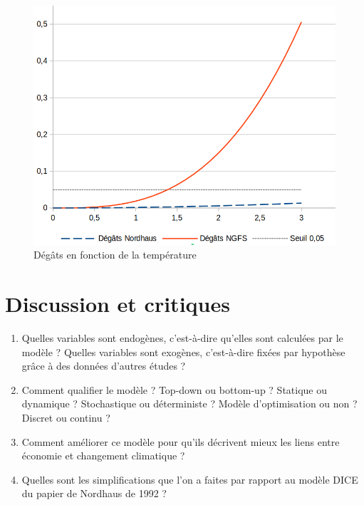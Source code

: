\documentclass[12pt]{article}
\theoremstyle{remark}
\begin{document}
\begin{figure}[h]
\centering
\includegraphics[scale=0.35]{images/fonction_degats.png}
\caption{Dégâts en fonction de la température}
\end{figure}

\section{Discussion et critiques}
\begin{enumerate}[resume]
\item Quelles variables sont endogènes, c'est-à-dire qu'elles sont calculées par le modèle ? Quelles variables sont exogènes, c'est-à-dire fixées par hypothèse grâce à des données d'autres études ?
\item Comment qualifier le modèle ? Top-down ou bottom-up ? Statique ou dynamique ? Stochastique ou déterministe ? Modèle d'optimisation ou non ? Discret ou continu ?
\item Comment améliorer ce modèle pour qu'ils décrivent mieux les liens entre économie et changement climatique ?
\item Quelles sont les simplifications que l'on a faites par rapport au modèle DICE du papier de Nordhaus de 1992 ?
\end{enumerate}
\end{document}
